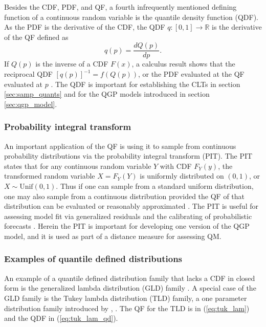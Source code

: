 \documentclass[preprint,12pt,authoryear]{elsarticle}
\newcommand{\1}[1]{\mathds{1}\left[#1\right]}
\begin{document}
Besides the CDF, PDF, and QF, a  fourth infrequently mentioned defining function 
of a continuous random variable is the quantile density function (QDF). As the 
PDF is the derivative of the CDF, the QDF $q:[0,1] \rightarrow \mathbb{R}$ is 
the derivative of the QF defined as
\[
    q(p) = \frac{dQ(p)}{dp}.
\]
If $Q(p)$ is the inverse of a CDF $F(x)$, a calculus result shows that the 
reciprocal QDF $[q(p)]^{-1} = f(Q(p))$, or the PDF evaluated at the QF 
evaluated at $p$ 
\cite[]{perepolkin2023tenets, gilchrist2000statistical}. The QDF is important 
for establishing the CLTs in section \ref{sec:samp_quants} and for the QGP 
models introduced in section \ref{sec:qgp_model}.

\subsubsection{Probability integral transform}
An important application of the QF is using it to sample from continuous 
probability distributions via the probability integral transform (PIT). The 
PIT states that for any continuous random variable $Y$ with CDF $F_Y(y)$, the 
transformed random variable $X = F_Y(Y)$ is uniformly distributed on $(0,1)$, 
or $X \sim \text{Unif}(0,1)$. Thus if one can sample from a standard uniform 
distribution, one may also sample from a continuous distribution provided the 
QF of that distribution can be evaluated or reasonably approximated 
\cite[]{wilkinson2018stochastic}. The PIT is useful for assessing model fit via 
generalized residuals \cite[]{yang2024double, cox1968general} and the 
calibrating of probabilistic forecasts \cite[]{gneiting2007probabilistic}. 
Herein the PIT is important for developing one version of the QGP model, and it 
is used as part of a distance measure for assessing QM.

\subsubsection{Examples of quantile defined distributions} \label{sec:quant_def_dist}

An example of a quantile defined distribution family that lacks a CDF in closed 
form is the generalized lambda distribution (GLD) family 
\cite[]{ramberg1974approximate, perepolkin2023tenets}. A special case of the 
GLD family is the Tukey lambda distribution (TLD) family, a one parameter 
distribution family introduced by \cite{tukey1960practical}, 
\cite[]{joiner1971some}. The QF for the TLD is in (\ref{eq:tuk_lam}) and the 
QDF in (\ref{eq:tuk_lam_qd}).   
\end{document}

